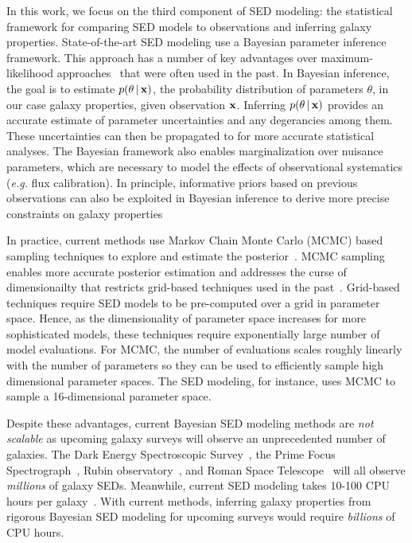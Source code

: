 In this work, we focus on the third component of SED modeling: the statistical
framework for comparing SED models to observations and inferring galaxy
properties. 
State-of-the-art SED modeling use a Bayesian parameter inference framework.
This approach has a number of key advantages over maximum-likelihood 
approaches~\citep[\emph{e.g.}][]{cidfernandes2005, tojeiro2007, koleva2008} 
that were often used in the past.
In Bayesian inference, the goal is to estimate $p(\theta\,|\, {\bf x})$, the
probability distribution of parameters $\theta$, in our case galaxy
properties, given observation ${\bf x}$. 
Inferring $p(\theta\,|\, {\bf x})$ provides an accurate estimate of parameter 
uncertainties and any degerancies among them.
These uncertainties can then be propagated to for more accurate statistical
analyses. 
The Bayesian framework also enables marginalization over nuisance parameters,
which are necessary to model the effects of observational systematics
(\emph{e.g.} flux calibration).
In principle, informative priors based on previous observations can also be
exploited in Bayesian inference to derive more precise constraints on galaxy
properties 

In practice, current methods use Markov Chain Monte Carlo (MCMC) based sampling
techniques to explore and estimate the
posterior~\citep[\emph{e.g.}][]{acquaviva2011, chevallard2016, carnall2017,
leja2017}. 
MCMC sampling enables more accurate posterior estimation and addresses the
curse of dimensionailty that restricts grid-based techniques used in the
past~\citep{kauffmann2003a, burgarella2005, salim2007, dacunha2008}.
Grid-based techniques require SED models to be pre-computed over a grid in
parameter space.
Hence, as the dimensionality of parameter space increases for more
sophisticated models, these techniques require exponentially large number of
model evaluations. 
For MCMC, the number of evaluations scales roughly linearly with the number of
parameters so they can be used to efficiently sample high dimensional parameter
spaces. 
The \cite{johnson2021} SED modeling, for instance, uses MCMC to sample a
16-dimensional parameter space. 

Despite these advantages, current Bayesian SED modeling methods are \emph{not
scalable} as upcoming galaxy surveys will observe an unprecedented number of
galaxies.
The Dark Energy Spectroscopic Survey~\citep[DESI;][]{desicollaboration2016},
the Prime Focus Spectrograph~\citep[PFS;][]{takada2014},
Rubin observatory~\citep{ivezic2019}, and Roman Space
Telescope~\citep{spergel2015} will all observe \emph{millions} of galaxy SEDs. 
Meanwhile, current SED modeling takes 10-100 CPU hours per
galaxy~\citep[\emph{e.g.}][]{carnall2019, tacchella2020}.
With current methods, inferring galaxy properties from rigorous Bayesian SED
modeling for upcoming surveys  would require \emph{billions} of CPU hours. 

